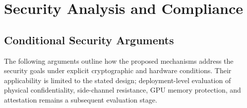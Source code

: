 \documentclass{ieeeaccess}
\begin{document}

\section{Security Analysis and Compliance}
\label{sec:security}

\subsection{Conditional Security Arguments}

The following arguments outline how the proposed mechanisms address the
security goals under explicit cryptographic and hardware conditions. Their
applicability is limited to the stated design; deployment-level evaluation of
physical confidentiality, side-channel resistance, GPU memory protection, and
attestation remains a subsequent evaluation stage.
\end{document}
